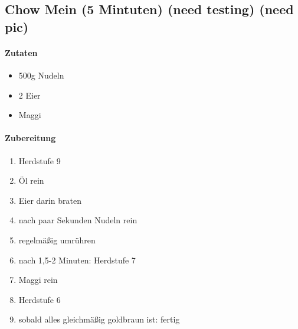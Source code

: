 \subsection{Chow Mein (5 Mintuten) (need testing) (need pic)}
\paragraph{Zutaten}
\begin{itemize}[noitemsep]
	\item 500g Nudeln 
	\item 2 Eier
	\item Maggi
\end{itemize}
\paragraph{Zubereitung}
\begin{enumerate}[noitemsep]
	\item Herdstufe 9
	\item Öl rein
	\item Eier darin braten
	\item nach paar Sekunden Nudeln rein 
	\item regelmäßig umrühren
	\item nach 1,5-2 Minuten: Herdstufe 7
	\item Maggi rein
	\item Herdstufe 6
	\item sobald alles gleichmäßig goldbraun ist: fertig
\end{enumerate}